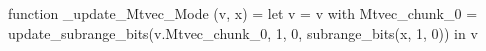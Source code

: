 function _update_Mtvec_Mode (v, x) = let v = { v with Mtvec_chunk_0 = update_subrange_bits(v.Mtvec_chunk_0, 1, 0, subrange_bits(x, 1, 0)) } in
  v
